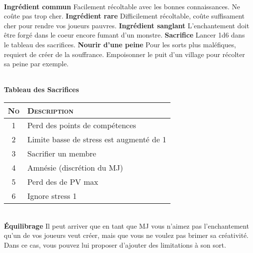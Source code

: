 \documentclass[11pt]{article} %
\newcommand{\scbf}[1]{\textsc{\textbf{#1}}}
\newcommand{\myjump}[1][1]{\mbox{}\\[#1cm]}
\begin{document}
\myjump[0.35]
\textbf{Ingrédient commun} \tabto{4.3cm}Facilement récoltable avec les bonnes connaissances. Ne coûte pas trop cher.\newline
\textbf{Ingrédient rare} \tabto{4.3cm}Difficilement récoltable, coûte suffisament cher pour rendre vos joueurs pauvres.\newline
\textbf{Ingrédient sanglant} \tabto{4.3cm}L'enchantement doit être forgé dans le coeur encore fumant d'un monstre.\newline
\textbf{Sacrifice} \tabto{4.3cm}Lancer 1d6 dans le tableau des sacrifices.\newline
\textbf{Nourir d'une peine} \tabto{4.3cm}Pour les sorts plus maléfiques, requiert de créer de la souffrance. Empoisonner le puit d'un village pour récolter sa peine par exemple.



\myjump[0]
\textbf{Tableau des Sacrifices}\newline\noindent
\begin{tabularx}{\linewidth}{|c|X|}
\hline
    \scbf{No} & \scbf{Description}\\
    \hline
    1 & Perd des points de compétences\\
    2 & Limite basse de stress est augmenté de 1\\
    3 & Sacrifier un membre\\
    4 & Amnésie (discrétion du MJ)\\
    5 & Perd des de PV max\\
    6 & Ignore stress 1\\\hline
\end{tabularx}


\myjump[0.35]
\textbf{\huge Équilibrage}\newline
Il peut arriver que en tant que MJ vous n'aimez pas l'enchantement qu'un de vos joueurs veut créer, mais que vous ne voulez pas brimer sa créativité. Dans ce cas, vous pouvez lui proposer d'ajouter des limitations à son sort.
\end{document}
